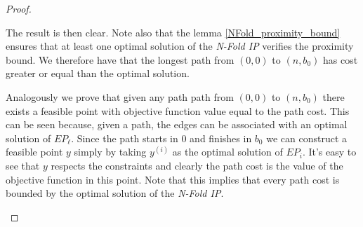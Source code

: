 \begin{proof}
\begin{center}
\end{center}


The result is then clear. Note also that the lemma \ref{NFold_proximity_bound} ensures that at least one optimal solution of the \emph{N-Fold IP} verifies the proximity bound. We therefore have that the longest path from $(0,0)$ to $(n,b_0)$ has cost greater or equal than the optimal solution.


Analogously we prove that given any path path from $(0,0)$ to $(n,b_0)$ there exists a feasible point with objective function value equal to the path cost. This can be seen because, given a path, the edges can be associated with an optimal solution of $EP_\ell$. Since the path starts in 0 and finishes in $b_0$ we can construct a feasible point $y$ simply by taking $y^{(i)}$ as the optimal solution of $EP_i$. It's easy to see that $y$ respects the constraints and clearly the path cost is the value of the objective function in this point. Note that this implies that every path cost is bounded by the optimal solution of the \emph{N-Fold IP}.



\begin{center}
\end{center}
\end{proof}
